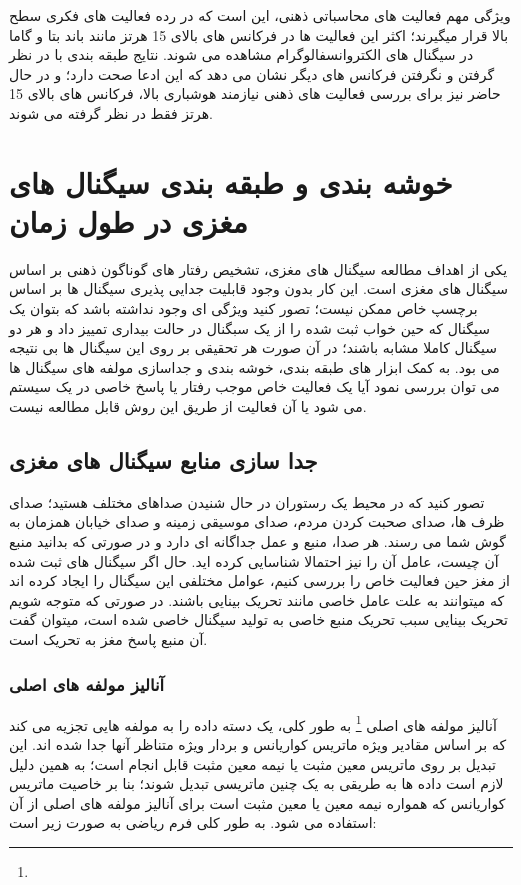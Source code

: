 \documentclass[11pt]{extarticle}
\begin{document}
ویژگی مهم فعالیت های محاسباتی ذهنی، این است که در رده فعالیت های فکری سطح بالا قرار میگیرند؛ اکثر این فعالیت ها در فرکانس های بالای 15 هرتز مانند باند بتا و گاما در سیگنال های الکتروانسفالوگرام مشاهده می شوند. نتایج طبقه بندی با در نظر گرفتن و نگرفتن فرکانس های دیگر نشان می دهد که این ادعا صحت دارد؛ و در حال حاضر نیز برای بررسی فعالیت های ذهنی نیازمند هوشباری بالا، فرکانس های بالای 15 هرتز فقط در نظر گرفته می شوند. 


\clearpage
\newpage

\section{خوشه بندی و طبقه بندی سیگنال های مغزی در طول زمان}

یکی از اهداف مطالعه سیگنال های مغزی، تشخیص رفتار های گوناگون ذهنی بر اساس سیگنال های مغزی است. این کار بدون وجود قابلیت جدایی پذیری سیگنال ها بر اساس برچسپ خاص ممکن نیست؛ تصور کنید ویژگی ای وجود نداشته باشد که بتوان یک سیگنال که حین خواب ثبت شده را از یک سبگنال در حالت بیداری تمییز داد و هر دو سیگنال کاملا مشابه باشند؛ در آن صورت هر تحقیقی بر روی این سیگنال ها بی نتیجه می بود. به کمک ابزار های طبقه بندی، خوشه بندی و جداسازی مولفه های سیگنال ها می توان بررسی نمود آیا یک فعالیت خاص موجب رفتار یا پاسخ خاصی در یک سیستم می شود یا آن فعالیت از طریق این روش قابل مطالعه نیست.

\subsection{جدا سازی منابع سیگنال های مغزی}

تصور کنید که در محیط یک رستوران در حال شنیدن صداهای مختلف هستید؛ صدای ظرف ها، صدای صحبت کردن مردم، صدای موسیقی زمینه و صدای خیابان همزمان به گوش شما می رسند. هر صدا، منبع و عمل جداگانه ای دارد و در صورتی که بدانید منبع آن چیست، عامل آن را نیز احتمالا شناسایی کرده اید. حال اگر سیگنال های ثبت شده از مغز حین فعالیت خاص را بررسی کنیم، عوامل مختلفی این سیگنال را ایجاد کرده اند که میتوانند به علت عامل خاصی مانند تحریک بینایی باشند. در صورتی که متوجه شویم تحریک بینایی سبب تحریک منبع خاصی به تولید سیگنال خاصی شده است، میتوان گفت آن منبع پاسخ مغز به تحریک است.

\subsubsection{آنالیز مولفه های اصلی}

آنالیز مولفه های اصلی	
\footnote{}
به طور کلی، یک دسته داده را به مولفه هایی تجزیه می کند که بر اساس مقادیر ویژه ماتریس کواریانس و بردار ویژه متناظر آنها جدا شده اند. این تبدیل بر روی ماتریس معین مثبت یا نیمه معین مثبت قابل انجام است؛ به همین دلیل لازم است داده ها به طریقی به یک چنین ماتریسی تبدیل شوند؛ بنا بر خاصیت ماتریس کواریانس که همواره نیمه معین یا معین مثبت است برای آنالیز مولفه های اصلی از آن استفاده می شود. به طور کلی فرم ریاضی به صورت زیر است:
\end{document}

